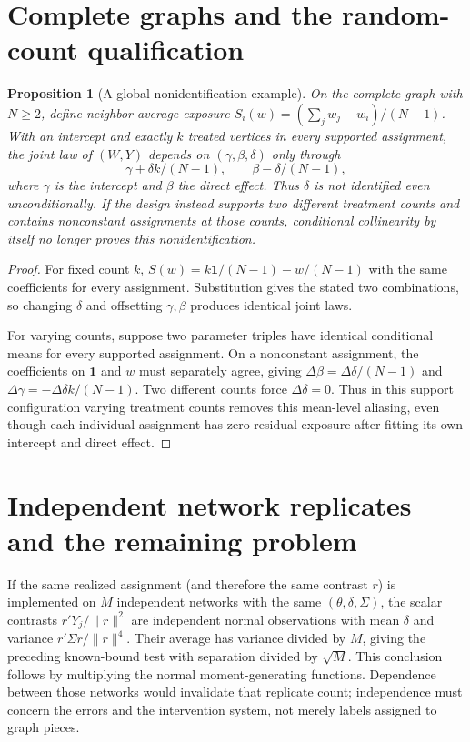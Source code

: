 \documentclass[11pt]{article}
\newtheorem{proposition}[theorem]{Proposition}
\theoremstyle{remark}\newtheorem{remark}[theorem]{Remark}
\begin{document}
\section*{Complete graphs and the random-count qualification}
\begin{proposition}[A global nonidentification example]
On the complete graph with $N\ge2$, define neighbor-average exposure
$S_i(w)=(\sum_jw_j-w_i)/(N-1)$. With an intercept and exactly $k$ treated vertices in every supported assignment, the joint law of $(W,Y)$ depends on $(\gamma,\beta,\delta)$ only through
\[
 \gamma+\delta k/(N-1),\qquad \beta-\delta/(N-1),
\]
where $\gamma$ is the intercept and $\beta$ the direct effect. Thus $\delta$ is not identified even unconditionally. If the design instead supports two different treatment counts and contains nonconstant assignments at those counts, conditional collinearity by itself no longer proves this nonidentification.
\end{proposition}
\begin{proof}
For fixed count $k$, $S(w)=k\mathbf1/(N-1)-w/(N-1)$ with the same coefficients for every assignment. Substitution gives the stated two combinations, so changing $\delta$ and offsetting $\gamma,\beta$ produces identical joint laws.

For varying counts, suppose two parameter triples have identical conditional means for every supported assignment. On a nonconstant assignment, the coefficients on $\mathbf1$ and $w$ must separately agree, giving $\Delta\beta=\Delta\delta/(N-1)$ and $\Delta\gamma=-\Delta\delta k/(N-1)$. Two different counts force $\Delta\delta=0$. Thus in this support configuration varying treatment counts removes this mean-level aliasing, even though each individual assignment has zero residual exposure after fitting its own intercept and direct effect.
\end{proof}

\section*{Independent network replicates and the remaining problem}
If the same realized assignment (and therefore the same contrast $r$) is implemented on $M$ independent networks with the same $(\theta,\delta,\Sigma)$, the scalar contrasts $r'Y_j/\|r\|^2$ are independent normal observations with mean $\delta$ and variance $r'\Sigma r/\|r\|^4$. Their average has variance divided by $M$, giving the preceding known-bound test with separation divided by $\sqrt M$. This conclusion follows by multiplying the normal moment-generating functions. Dependence between those networks would invalidate that replicate count; independence must concern the errors and the intervention system, not merely labels assigned to graph pieces.
\end{document}
